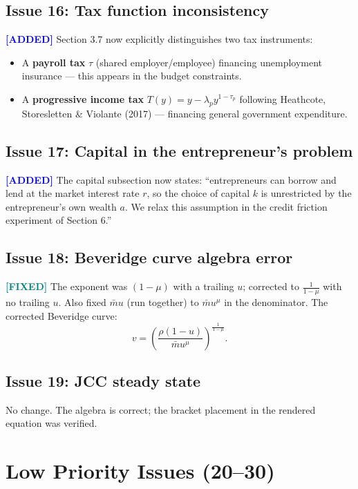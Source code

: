 \documentclass[11pt]{article}
\newcommand{\fixed}{\textcolor{teal}{\textbf{[FIXED]}}}
\newcommand{\added}{\textcolor{blue}{\textbf{[ADDED]}}}
\begin{document}
\subsection*{Issue 16: Tax function inconsistency}

\added{} Section 3.7 now explicitly distinguishes two tax instruments:
\begin{itemize}
    \item A \textbf{payroll tax} $\tau$ (shared employer/employee) financing unemployment insurance --- this appears in the budget constraints.
    \item A \textbf{progressive income tax} $T(y) = y - \lambda_p y^{1-\tau_p}$ following Heathcote, Storesletten \& Violante (2017) --- financing general government expenditure.
\end{itemize}

\subsection*{Issue 17: Capital in the entrepreneur's problem}

\added{} The capital subsection now states: ``entrepreneurs can borrow and lend at the market interest rate $r$, so the choice of capital $k$ is unrestricted by the entrepreneur's own wealth $a$. We relax this assumption in the credit friction experiment of Section 6.''

\subsection*{Issue 18: Beveridge curve algebra error}

\fixed{} The exponent was $(1-\mu)$ with a trailing $u$; corrected to $\frac{1}{1-\mu}$ with no trailing $u$. Also fixed $\bar{m}u$ (run together) to $\bar{m}u^{\mu}$ in the denominator. The corrected Beveridge curve:
\[
v = \left(\frac{\rho(1-u)}{\bar{m}u^{\mu}}\right)^{\frac{1}{1-\mu}}.
\]

\subsection*{Issue 19: JCC steady state}

No change. The algebra is correct; the bracket placement in the rendered equation was verified.

\section*{Low Priority Issues (20--30)}
\end{document}
